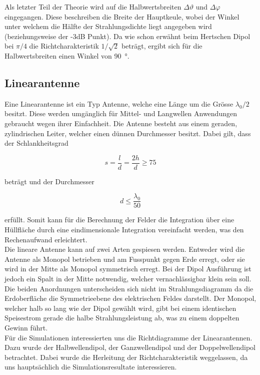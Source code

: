 Als letzter Teil der Theorie wird auf die Halbwertsbreiten $\Delta \vartheta$ und $\Delta \varphi$ eingegangen. Diese beschreiben die Breite der Hauptkeule, wobei der Winkel unter welchem die Hälfte der Strahlungsdichte liegt angegeben wird (beziehungsweise der -3dB Punkt). Da wie schon erwähnt beim Hertschen Dipol bei $\pi/4$ die Richtcharakteristik $1/\sqrt{2}$ beträgt, ergibt sich für die Halbwertsbreiten einen Winkel von \SI{90}{\degree}.

\subsection{Linearantenne}

Eine Linearantenne ist ein Typ Antenne, welche eine Länge um die Grösse $\lambda_0/2$ besitzt. Diese werden umgänglich für Mittel- und Langwellen Anwendungen gebraucht wegen ihrer Einfachheit. Die Antenne besteht aus einem geraden, zylindrischen Leiter, welcher einen dünnen Durchmesser besitzt. Dabei gilt, dass der Schlankheitsgrad

\begin{equation}
s = \frac{l}{d}=\frac{2h}{d} \geq 75
\end{equation} 

beträgt und der Durchmesser

\begin{equation}
d \leq \frac{\lambda_0}{50}
\end{equation}

erfüllt. Somit kann für die Berechnung der Felder die Integration über eine Hüllfläche durch eine eindimensionale Integration vereinfacht werden, was den Rechenaufwand erleichtert.\\
Die lineare Antenne kann auf zwei Arten gespiesen werden. Entweder wird die Antenne als Monopol betrieben und am Fusspunkt gegen Erde erregt, oder sie wird in der Mitte als Monopol symmetrisch erregt. Bei der Dipol Ausführung ist jedoch ein Spalt in der Mitte notwendig, welcher vernachlässigbar klein sein soll. Die beiden Anordnungen unterscheiden sich nicht im Strahlungsdiagramm da die Erdoberfläche die Symmetrieebene des elektrischen Feldes darstellt. Der Monopol, welcher halb so lang wie der Dipol gewählt wird, gibt bei einem identischen Speisestrom gerade die halbe Strahlungsleistung ab, was zu einem doppelten Gewinn führt.\\

Für die Simulationen interessierten uns die Richtdiagramme der Linearantennen. Dazu wurde der Halbwellendipol, der Ganzwellendipol und der Doppelwellendipol betrachtet. Dabei wurde die Herleitung der Richtcharakteristik weggelassen, da uns hauptsächlich die Simulationsresultate interessieren.\\

